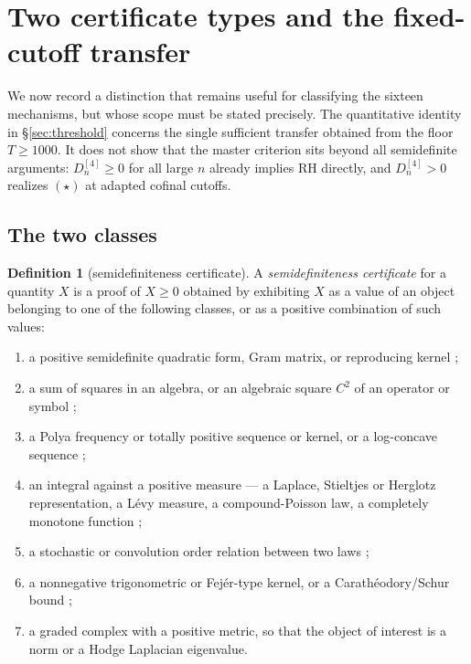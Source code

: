 \documentclass[11pt]{amsart}
\theoremstyle{definition}
\newtheorem{definition}[theorem]{Definition}
\theoremstyle{remark}
\theoremstyle{definition}
\begin{document}
\section{Two certificate types and the fixed-cutoff transfer}\label{sec:dichotomy}

We now record a distinction that remains useful for classifying the sixteen mechanisms, but whose
scope must be stated precisely.  The quantitative identity in \S\ref{sec:threshold} concerns the
single sufficient transfer obtained from the floor $T\ge1000$.  It does not show that the master
criterion sits beyond all semidefinite arguments: $D_n^{[4]}\ge0$ for all large $n$ already
implies RH directly, and $D_n^{[4]}>0$ realizes $(\star)$ at adapted cofinal cutoffs.

\subsection{The two classes}

\begin{definition}[semidefiniteness certificate]\label{def:semidef}
A \emph{semidefiniteness certificate} for a quantity $X$ is a proof of $X\ge0$ obtained by
exhibiting $X$ as a value of an object belonging to one of the following classes, or as a
positive combination of such values:
\begin{enumerate}[label=\textup{(S\arabic*)},leftmargin=*]
\item a positive semidefinite quadratic form, Gram matrix, or reproducing kernel
      \cite{Aronszajn,HornJohnson};
\item a sum of squares in an algebra, or an algebraic square $C^2$ of an operator or symbol
      \cite{Reznick,Marshall,Scheiderer};
\item a Polya frequency or totally positive sequence or kernel, or a log-concave sequence
      \cite{Karlin,Schoenberg,BrandenSurvey};
\item an integral against a positive measure --- a Laplace, Stieltjes or Herglotz
      representation, a L\'evy measure, a compound-Poisson law, a completely monotone function
      \cite{Widder,SSV,Sato,SteutelVanHarn};
\item a stochastic or convolution order relation between two laws \cite{ShakedShanthikumar};
\item a nonnegative trigonometric or Fej\'er-type kernel, or a Carath\'eodory/Schur bound
      \cite{Fejer,Caratheodory,Toeplitz,Schur};
\item a graded complex with a positive metric, so that the object of interest is a norm or a
      Hodge Laplacian eigenvalue.
\end{enumerate}
\end{definition}
\end{document}

